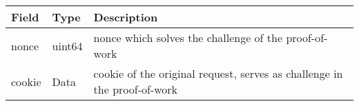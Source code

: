 \begin{tabularx}{.85\linewidth}{llX}
	\toprule
	Field & Type & Description
	\\
	\midrule
	nonce & uint64 & nonce which solves the challenge of the proof-of-work
	\\
	cookie & Data & cookie of the original request, serves as challenge in the proof-of-work
	\\
	\bottomrule
\end{tabularx}
